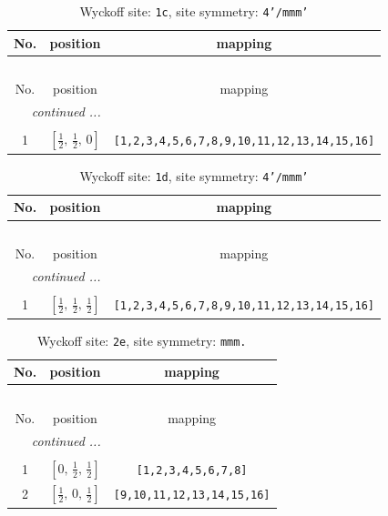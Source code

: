 \documentclass[fleqn,8pt]{jsarticle}
\begin{document}
\begin{longtable}{ccc}
\caption{Wyckoff site: {\tt 1c}, site symmetry: {\tt 4'/mmm'}}
 \\
 \hline \hline
No. & position & mapping \\ \hline \endfirsthead

\multicolumn{2}{l}{\tablename\ \thetable{}} \\
 \hline \hline
No. & position & mapping \\ \hline \endhead

 \hline \hline
\multicolumn{2}{r}{\footnotesize\it continued ...} \\ \endfoot

 \hline \hline
\multicolumn{2}{r}{} \\ \endlastfoot

1 & $\left[ \frac{1}{2},\, \frac{1}{2},\, 0 \right]$ & {\tt [1,2,3,4,5,6,7,8,9,10,11,12,13,14,15,16]} \\
\end{longtable}
\renewcommand{\arraystretch}{1.2}
\begin{longtable}{ccc}
\caption{Wyckoff site: {\tt 1d}, site symmetry: {\tt 4'/mmm'}}
 \\
 \hline \hline
No. & position & mapping \\ \hline \endfirsthead

\multicolumn{2}{l}{\tablename\ \thetable{}} \\
 \hline \hline
No. & position & mapping \\ \hline \endhead

 \hline \hline
\multicolumn{2}{r}{\footnotesize\it continued ...} \\ \endfoot

 \hline \hline
\multicolumn{2}{r}{} \\ \endlastfoot

1 & $\left[ \frac{1}{2},\, \frac{1}{2},\, \frac{1}{2} \right]$ & {\tt [1,2,3,4,5,6,7,8,9,10,11,12,13,14,15,16]} \\
\end{longtable}
\renewcommand{\arraystretch}{1.2}
\begin{longtable}{ccc}
\caption{Wyckoff site: {\tt 2e}, site symmetry: {\tt mmm.}}
 \\
 \hline \hline
No. & position & mapping \\ \hline \endfirsthead

\multicolumn{2}{l}{\tablename\ \thetable{}} \\
 \hline \hline
No. & position & mapping \\ \hline \endhead

 \hline \hline
\multicolumn{2}{r}{\footnotesize\it continued ...} \\ \endfoot

 \hline \hline
\multicolumn{2}{r}{} \\ \endlastfoot

1 & $\left[ 0,\, \frac{1}{2},\, \frac{1}{2} \right]$ & {\tt [1,2,3,4,5,6,7,8]} \\ \hline
2 & $\left[ \frac{1}{2},\, 0,\, \frac{1}{2} \right]$ & {\tt [9,10,11,12,13,14,15,16]} \\
\end{longtable}
\end{document}
